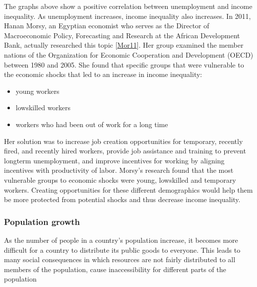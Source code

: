 \documentclass[letterpaper,10pt,english]{jupyterBook}
\begin{document}
\noindent{}

\noindent{}

\sphinxAtStartPar
The graphs above show a positive correlation between unemployment and income inequality. As unemployment increases, income inequality also increases. In 2011, Hanan Morsy, an Egyptian economist who serves as the Director of Macroeconomic Policy, Forecasting and Research at the African Development Bank, actually researched this topic {[}\hyperlink{cite.content/references:id7}{Mor11}{]}. Her group examined the member nations of the Organization  for  Economic  Cooperation  and  Development  (OECD) between 1980 and 2005. She found that specific groups that were vulnerable to the economic shocks that led to an increase in income inequality:
\begin{itemize}
\item {} 
\sphinxAtStartPar
young workers

\item {} 
\sphinxAtStartPar
low\sphinxhyphen{}skilled workers

\item {} 
\sphinxAtStartPar
workers who had been out of work for a long time

\end{itemize}

\sphinxAtStartPar
Her solution was to increase job creation opportunities for temporary, recently fired, and recently hired workers, provide job assistance and training to prevent long\sphinxhyphen{}term unemployment, and improve incentives for working by aligning incentives with productivity of labor. Morsy’s research found that the most vulnerable groups to economic shocks were young, low\sphinxhyphen{}skilled and temporary workers. Creating opportunities for these different demographics would help them be more protected from potential shocks and thus decrease income inequality.


\subsubsection{Population growth}
\label{\detokenize{content/06-inequality/historical-inequality:population-growth}}
\sphinxAtStartPar
As the number of people in a country’s population increase, it becomes more difficult for a country to distribute its public goods to everyone. This leads to many social consequences in which resources are not fairly distributed to all members of the population, cause inaccessibility for different parts of the population
\end{document}
